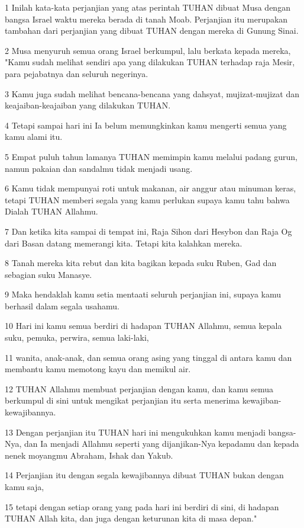 \par 1 Inilah kata-kata perjanjian yang atas perintah TUHAN dibuat Musa dengan bangsa Israel waktu mereka berada di tanah Moab. Perjanjian itu merupakan tambahan dari perjanjian yang dibuat TUHAN dengan mereka di Gunung Sinai.
\par 2 Musa menyuruh semua orang Israel berkumpul, lalu berkata kepada mereka, "Kamu sudah melihat sendiri apa yang dilakukan TUHAN terhadap raja Mesir, para pejabatnya dan seluruh negerinya.
\par 3 Kamu juga sudah melihat bencana-bencana yang dahsyat, mujizat-mujizat dan keajaiban-keajaiban yang dilakukan TUHAN.
\par 4 Tetapi sampai hari ini Ia belum memungkinkan kamu mengerti semua yang kamu alami itu.
\par 5 Empat puluh tahun lamanya TUHAN memimpin kamu melalui padang gurun, namun pakaian dan sandalmu tidak menjadi usang.
\par 6 Kamu tidak mempunyai roti untuk makanan, air anggur atau minuman keras, tetapi TUHAN memberi segala yang kamu perlukan supaya kamu tahu bahwa Dialah TUHAN Allahmu.
\par 7 Dan ketika kita sampai di tempat ini, Raja Sihon dari Hesybon dan Raja Og dari Basan datang memerangi kita. Tetapi kita kalahkan mereka.
\par 8 Tanah mereka kita rebut dan kita bagikan kepada suku Ruben, Gad dan sebagian suku Manasye.
\par 9 Maka hendaklah kamu setia mentaati seluruh perjanjian ini, supaya kamu berhasil dalam segala usahamu.
\par 10 Hari ini kamu semua berdiri di hadapan TUHAN Allahmu, semua kepala suku, pemuka, perwira, semua laki-laki,
\par 11 wanita, anak-anak, dan semua orang asing yang tinggal di antara kamu dan membantu kamu memotong kayu dan memikul air.
\par 12 TUHAN Allahmu membuat perjanjian dengan kamu, dan kamu semua berkumpul di sini untuk mengikat perjanjian itu serta menerima kewajiban-kewajibannya.
\par 13 Dengan perjanjian itu TUHAN hari ini mengukuhkan kamu menjadi bangsa-Nya, dan Ia menjadi Allahmu seperti yang dijanjikan-Nya kepadamu dan kepada nenek moyangmu Abraham, Ishak dan Yakub.
\par 14 Perjanjian itu dengan segala kewajibannya dibuat TUHAN bukan dengan kamu saja,
\par 15 tetapi dengan setiap orang yang pada hari ini berdiri di sini, di hadapan TUHAN Allah kita, dan juga dengan keturunan kita di masa depan."
